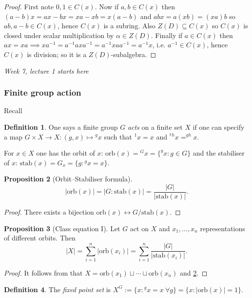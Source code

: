 \documentclass[a4paper]{article}
\newcommand{\orb}{\text{orb}}
\newcommand{\stab}{\text{stab}}
\theoremstyle{definition}
\newtheorem{defn}{Definition}[subsection]
\newtheorem{prop}[defn]{Proposition}
\begin{document}
\begin{proof}
First note $0,1\in C(x)$. Now if $a,b\in C(x)$ then $(a-b)x=ax-bx=xa-xb=x(a-b)$ and $abx=a(xb)=(xa)b$ so $ab,a-b\in C(x)$, hence $C(x)$ is a subring. Also $Z(D)\subseteq C(x)$ so $C(x)$ is closed under scalar multiplication by $\alpha\in Z(D)$. Finally if $a\in C(x)$ then $ax=xa\implies xa^{-1}=a^{-1}axa^{-1}=a^{-1}xaa^{-1}=a^{-1}x$, i.e. $a^{-1}\in C(x)$, hence $C(x)$ is division; so it is a $Z(D)$-subalgebra.
\end{proof}

\begin{flushright}
\textit{Week 7, lecture 1 starts here}
\end{flushright}

\subsubsection{Finite group action}

Recall
\begin{defn}
One says a finite group $G$ \textit{acts} on a finite set $X$ if one can specify a map $G\times X\rightarrow X:(g,x)\mapsto {}^g x$ such that $^1x=x$ and ${}^{^g}{}^h x=^{gh} x$.

For $x\in X$ one has the orbit of $x$: $\orb(x)={}^G x=\{^g x:g\in G\}$ and the stabiliser of $x$: $\stab(x)=G_x=\{g:{}^gx=x\}$.
\end{defn}

\begin{prop}[Orbit–Stabiliser formula]
\label{prop:OSformula}
\[
|\orb(x)|=|G:\stab(x)|=\frac{|G|}{|\stab(x)|}.
\]
\end{prop}
\begin{proof}
There exists a bijection $\orb(x)\leftrightarrow G/\stab(x)$.
\end{proof}

\begin{prop}[Class equation I]
Let $G$ act on $X$ and $x_1,\ldots,x_n$ representations of different orbits. Then
\[
|X|=\sum_{i=1}^n |\orb(x_i)|=\sum_{i=1}^n \frac{|G|}{|\stab(x_i)|}.
\]
\end{prop}
\begin{proof}
It follows from that $X=\orb(x_1)\sqcup\cdots\sqcup\orb(x_n)$ and \ref{prop:OSformula}.
\end{proof}

\begin{defn}
The \textit{fixed point set} is $X^G:=\{x:{}^gx=x \ \forall g\}=\{x:|\orb(x)|=1\}$.
\end{defn}
\end{document}
